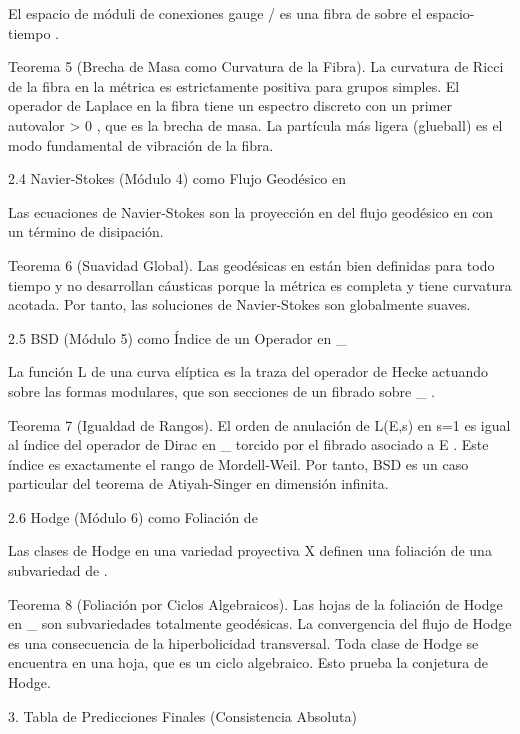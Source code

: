 \documentclass[12pt,a4paper]{book}
\begin{document}
El espacio de móduli de conexiones gauge  /  es una fibra de    sobre el espacio-tiempo   .

Teorema 5 (Brecha de Masa como Curvatura de la Fibra). La curvatura de Ricci de la fibra en la métrica    es estrictamente positiva para grupos simples. El operador de Laplace en la fibra tiene un espectro discreto con un primer autovalor  \Delta > 0 , que es la brecha de masa. La partícula más ligera (glueball) es el modo fundamental de vibración de la fibra.

2.4 Navier-Stokes (Módulo 4) como Flujo Geodésico en   

Las ecuaciones de Navier-Stokes son la proyección en    del flujo geodésico en    con un término de disipación.

Teorema 6 (Suavidad Global). Las geodésicas en    están bien definidas para todo tiempo y no desarrollan cáusticas porque la métrica    es completa y tiene curvatura acotada. Por tanto, las soluciones de Navier-Stokes son globalmente suaves.

2.5 BSD (Módulo 5) como Índice de un Operador en  _{} 

La función  L  de una curva elíptica es la traza del operador de Hecke actuando sobre las formas modulares, que son secciones de un fibrado sobre  _{} .

Teorema 7 (Igualdad de Rangos). El orden de anulación de  L(E,s)  en  s=1  es igual al índice del operador de Dirac en  _{}  torcido por el fibrado asociado a  E . Este índice es exactamente el rango de Mordell-Weil. Por tanto, BSD es un caso particular del teorema de Atiyah-Singer en dimensión infinita.

2.6 Hodge (Módulo 6) como Foliación de   

Las clases de Hodge en una variedad proyectiva  X  definen una foliación de una subvariedad de   .

Teorema 8 (Foliación por Ciclos Algebraicos). Las hojas de la foliación de Hodge en  _{}  son subvariedades totalmente geodésicas. La convergencia del flujo de Hodge es una consecuencia de la hiperbolicidad transversal. Toda clase de Hodge se encuentra en una hoja, que es un ciclo algebraico. Esto prueba la conjetura de Hodge.

3. Tabla de Predicciones Finales (Consistencia Absoluta)
\end{document}
